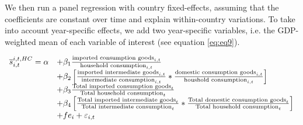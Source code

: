 \documentclass[11pt,a4paper]{article} %
\begin{document}
%
%
%

We then run a panel regression with country fixed-effects, assuming that the coefficients are constant over time and explain within-country variations. 
To take into account year-specific effects, we add two year-specific variables, i.e. the GDP-weighted mean of each variable of interest (see equation \ref{eq:eq9}). 


\begin{equation}
	\begin{array}{llll}
		\overline{s}_{i,t}^{i,t,HC}= \alpha &+  \beta_1  \frac{\textnormal{imported consumption goods}_{i,t}}{\textnormal{household consumption}_{i,t}} \\
		& + \beta_2 \left[ \frac{\textnormal{imported intermediate goods}_{i,t}}{\textnormal{intermediate consumption}_{i,t}}*\frac{\textnormal{domestic consumption goods}_{i,t}}{\textnormal{houshold consumption}_{i,t}}\right] \\ 
		&+  \beta_3 \frac{\textnormal{Total imported consumption goods}_t}{\textnormal{Total household consumption}_t} \\
		& + \beta_4  \left[ \frac{\textnormal{Total imported intermediate goods}_t}{\textnormal{Total intermediate consumption}_t}*\frac{\textnormal{Total domestic consumption goods}_t}{\textnormal{Total household consumption}_t} \right] \\ 
		& +fe_{i}+\varepsilon_{i,t}
	\end{array}
	\label{eq:eq9}
\end{equation}
\end{document}
